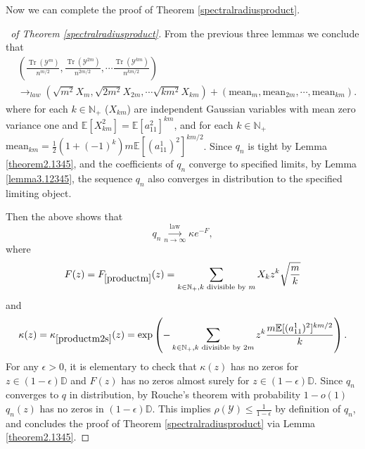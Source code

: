 \documentclass[12pt, reqno]{amsart}
\theoremstyle{definition}
\theoremstyle{remark}
\numberwithin{equation}{section}
\begin{document}
Now we can complete the proof of Theorem \ref{spectralradiusproduct}.

\begin{proof}[\proofname\ of Theorem \ref{spectralradiusproduct}]
From the previous three lemmas we conclude that 
$$\begin{aligned}&
\left(\frac{\operatorname{Tr}(\mathcal{Y}^m)}{n^{m/2}},\frac{\operatorname{Tr}(\mathcal{Y}^{2m})}{n^{2m/2}},\cdots \frac{\operatorname{Tr}(\mathcal{Y}^{km})}{n^{km/2}}\right)\\&\to_{law} (\sqrt{m^2}X_m,\sqrt{2m^2}X_{2m},\cdots \sqrt{km^2}X_{km})+(\text{mean}_m,\text{mean}_{2m},\cdots, \text{mean}_{km}).
\end{aligned}$$
    where for each $k\in\mathbb{N}_+$ ($X_{km}$) are independent Gaussian variables with mean zero variance one and $\mathbb{E}[X_{km}^2]=\mathbb{E}[a_{11}^2]^{km}$, and for each $k\in\mathbb{N}_+$ $\text{mean}_{km}=\frac{1}{2}(1+(-1)^k)m\mathbb{E}[(a_{11}^1)^2]^{km/2}$. 
Since $q_n$ is tight by Lemma \ref{theorem2.1345}, and the coefficients of $q_n$ converge to specified limits, by Lemma \ref{lemma3.12345}, the sequence $q_n$ also converges in distribution to the specified limiting object.

Then the above shows that 
\begin{equation}\label{expressionqns}q_n
\overset{\text{law}}{\underset{n\to\infty}{\longrightarrow}} \kappa e^{-F},\end{equation}
where 
\begin{equation}\label{productm}F(z)=F_{\eqref{productm}}(z)=\sum_{k\in\mathbb{N}_+,k\text{ divisible by }m} X_k z^k\sqrt{\frac{m}{k}}\end{equation}
and 
\begin{equation}\label{productm2s}\kappa(z)=
\kappa_{\eqref{productm2s}}(z)=\exp\left(-\sum_{k\in\mathbb{N}_+,k\text{ divisible by }2m} z^k\frac{m\mathbb{E}[(a_{11}^1)^2]^{km/2}}{k}\right).
\end{equation}
For any $\epsilon>0$, it is elementary to check that $\kappa(z)$ has no zeros for $z\in(1-\epsilon)\mathbb{D}$ and $F(z)$ has no zeros almost surely for $z\in(1-\epsilon)\mathbb{D}$.
Since $q_n$ converges to $q$ in distribution, by Rouche's theorem with probability $1-o(1)$ $q_n(z)$ has no zeros in $(1-\epsilon)\mathbb{D}$. This implies $\rho(\mathcal{Y})\leq \frac{1}{1-\epsilon}$ by definition of $q_n$, and concludes the proof of Theorem \ref{spectralradiusproduct} via Lemma \ref{theorem2.1345}.
\end{proof}
\end{document}
